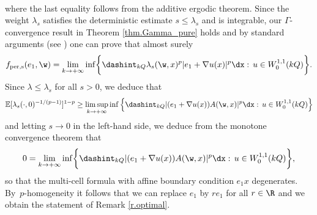 \begin{example}
\begin{align*}
\end{align*}
where the last equality follows from the additive ergodic theorem. Since the weight $\lambda_s$ satisfies the deterministic estimate $s\leq\lambda_s$ and is integrable, our $\Gamma$-convergence result in Theorem \ref{thm.Gamma_pure} holds and by standard arguments (see \cite[\S 4.7]{NSS}) one can prove that almost surely
\begin{equation*}
f_\mathrm{per,s}(e_1,\w)=\lim_{k\to +\infty}\inf\biggl\{\dashint_{kQ}\lambda_s(\w,x)^p|e_1+\nabla u(x)|^p\dx:\,u\in W_0^{1,1}(kQ)\biggr\}.
\end{equation*}
Since $\lambda\leq\lambda_s$ for all $s>0$, we deduce that
\begin{equation*}
\mathbb{E}[\lambda_s(\cdot,0)^{-1/(p-1)}]^{1-p}\geq \limsup_{k\to +\infty}\inf\left\{\dashint_{kQ}|(e_1+\nabla u(x))A(\w,x)|^p\dx:\,u\in W_0^{1,1}(kQ)\right\}
\end{equation*}
and letting $s\to 0$ in the left-hand side, we deduce from the monotone convergence theorem that
\begin{equation*}
0=\lim_{k\to +\infty}\inf\biggl\{\dashint_{kQ}|(e_1+\nabla u(x))A(\w,x)|^p\dx:\,u\in W_0^{1,1}(kQ)\biggr\},
\end{equation*}
so that the multi-cell formula with affine boundary condition $e_1x$ degenerates. By~$p$\nobreakdash-homogeneity it follows that we can replace $e_1$ by $re_1$ for all $r\in\R$ and we obtain the statement of Remark \ref{r.optimal}.
\end{example}

